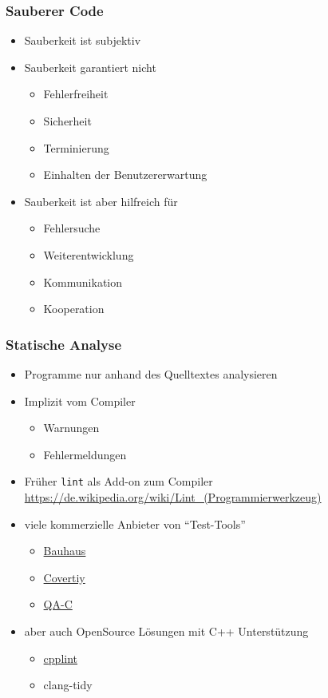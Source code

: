 \documentclass[aspectratio=169]{beamer}
\begin{document}
\begin{frame}
  \frametitle{Sauberer Code}
  \begin{itemize}
  \item Sauberkeit ist subjektiv
    \pause
  \item Sauberkeit garantiert nicht
    \begin{itemize}
    \item Fehlerfreiheit \pause
    \item Sicherheit \pause
    \item Terminierung \pause
    \item Einhalten der Benutzererwartung \pause
    \end{itemize}
    \pause
  \item Sauberkeit ist aber hilfreich für
    \begin{itemize}
      \pause
    \item Fehlersuche \pause
    \item Weiterentwicklung \pause
    \item Kommunikation \pause
    \item Kooperation
    \end{itemize}
  \end{itemize}
\end{frame}

\begin{frame}
  \frametitle{Statische Analyse}
  \begin{itemize}
  \item Programme nur anhand des Quelltextes analysieren
    \pause
  \item Implizit vom Compiler
    \begin{itemize}
    \item Warnungen \pause 
    \item Fehlermeldungen \pause
    \end{itemize}
  \item Früher \texttt{lint} als Add-on zum Compiler\\
    \qquad \url{https://de.wikipedia.org/wiki/Lint_(Programmierwerkzeug)}
    \pause
  \item viele kommerzielle Anbieter von ``Test-Tools''
    \begin{itemize}
    \item \href{https://en.wikipedia.org/wiki/Bauhaus_Project_(computing)}{Bauhaus}
    \pause
    \item \href{https://en.wikipedia.org/wiki/Coverity}{Covertiy}
      \pause
    \item \href{https://en.wikipedia.org/wiki/QA-C}{QA-C}
    \end{itemize}
  \item aber auch OpenSource Lösungen mit C++ Unterstützung
    \pause
    \begin{itemize}
    \item \href{https://en.wikipedia.org/wiki/Cpplint}{cpplint}
      \pause
    \item clang-tidy
      \pause
    \end{itemize}
  \end{itemize}
\end{frame}
\end{document}
